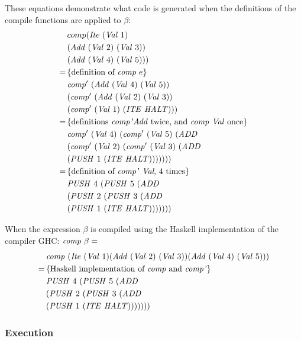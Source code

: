 \documentclass {article}
\begin{document}
These equations demonstrate what code is generated
when the definitions of the compile functions are applied to $\beta$:
\begin{align*}
	&comp (\Ite	(\Val 1) \\
				&(\Add (\Val 2)\ (\Val 3)) \\
				& (\Add (\Val 4)\ (\Val 5))) \\
	=\, & \{ \mbox{definition of \comp\ $e$} \}\ \\ 
	&\Compp  (\Add (\Val 4)\ (\Val 5))\\
		&(\Compp  (\Add (\Val 2)\ (\Val 3))\\
			&(\Compp  (\Val 1)\ (\ITE  \HALT))) \\
	=\, & \{ \mbox{definitions \compp \add\ twice, 
					and \comp\ \val\ once} \} \\
	&\Compp  (\Val 4)\ (\Compp  (\Val 5)\ (\ADD  \\
	&(\Compp  (\Val 2)\ (\Compp  (\Val 3)\ (\ADD  \\
	&(\PUSH 1\ (\ITE \HALT))))))) \\
	=\, & \{ \mbox{definition of \compp\ \val, 4 times} \} \\
	&\PUSH 4\ (\PUSH 5\ (\ADD \\
			&(\PUSH 2\ (\PUSH 3\ (\ADD \\
			&(\PUSH 1\ (\ITE \HALT)))))))
\end{align*}

When the expression $\beta$ is compiled
using the Haskell implementation of the compiler
GHC: \( \Comp \beta =\)
\begin{align*}
&\Comp (\Ite
			(\Val 1)
			(\Add (\Val 2)\ (\Val 3))
			(\Add (\Val 4)\ (\Val 5))) \\
=\, & \{ \mbox{Haskell implementation of \comp\ and \compp} \} \\
&\PUSH 4\ (\PUSH 5\ (\ADD \\
			&(\PUSH 2\ (\PUSH 3\ (\ADD \\
			&(\PUSH 1\ (\ITE \HALT)))))))
\end{align*}
	
\subsubsection{Execution}
\end{document}

